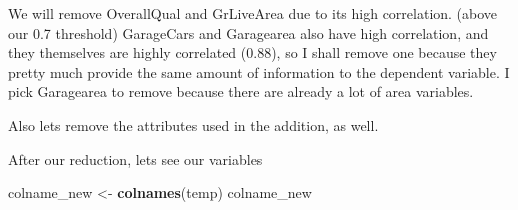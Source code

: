 \documentclass[]{article}
\newenvironment{Shaded}{\begin{snugshade}}{\end{snugshade}}
\newcommand{\KeywordTok}[1]{\textcolor[rgb]{0.13,0.29,0.53}{\textbf{#1}}}
\newcommand{\StringTok}[1]{\textcolor[rgb]{0.31,0.60,0.02}{#1}}
\newcommand{\OtherTok}[1]{\textcolor[rgb]{0.56,0.35,0.01}{#1}}
\newcommand{\OperatorTok}[1]{\textcolor[rgb]{0.81,0.36,0.00}{\textbf{#1}}}
\newcommand{\NormalTok}[1]{#1}
\begin{document}
We will remove OverallQual and GrLiveArea due to its high correlation.
(above our 0.7 threshold) GarageCars and Garagearea also have high
correlation, and they themselves are highly correlated (0.88), so I
shall remove one because they pretty much provide the same amount of
information to the dependent variable. I pick Garagearea to remove
because there are already a lot of area variables.

Also lets remove the attributes used in the addition, as well.

\begin{Shaded}
\end{Shaded}

After our reduction, lets see our variables

\begin{Shaded}
\begin{Highlighting}[]
\NormalTok{colname_new <-}\StringTok{ }\KeywordTok{colnames}\NormalTok{(temp)}
\NormalTok{colname_new}
\end{Highlighting}
\end{Shaded}
\end{document}
